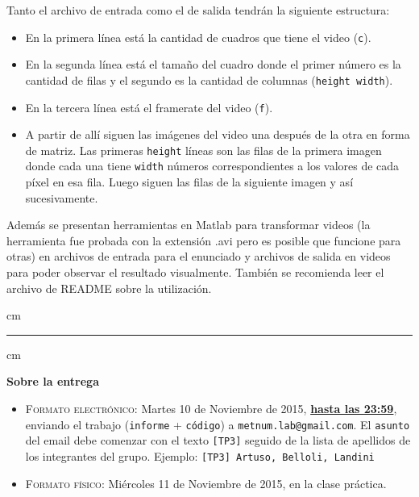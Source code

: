     Tanto el archivo de entrada como el de salida tendrán la siguiente estructura:

    \begin{itemize}
      \item En la primera línea está la cantidad de cuadros que tiene el video (\verb|c|).
      \item En la segunda línea está el tamaño del cuadro donde el primer número es la cantidad de filas y el segundo es la cantidad de columnas (\verb|height width|).
      \item En la tercera línea está el framerate del video (\verb|f|).
      \item A partir de allí siguen las imágenes del video una después de la otra en forma de matriz. Las primeras \verb|height| l\'ineas son las filas de la primera imagen donde cada una tiene \verb|width| n\'umeros correspondientes a los valores de cada píxel en esa fila. Luego siguen las filas de la siguiente imagen y as\'i sucesivamente.
    \end{itemize}

    Además se presentan herramientas en Matlab para transformar videos (la herramienta fue probada con la extensión .avi pero es posible que funcione para otras) en archivos de entrada para el enunciado y archivos de salida en videos para poder observar el resultado visualmente. También se recomienda leer el archivo de README sobre la utilización.


     cm
    \hrule
     cm

    {\bf Sobre la entrega}
    \begin{itemize}
    \item \textsc{Formato electr\'onico:} Martes 10 de Noviembre de 2015, {\bf{\underline{hasta las 23:59}}}, enviando el trabajo
    (\texttt{informe} + \texttt{c\'odigo}) a \texttt{metnum.lab@gmail.com}. El \texttt{asunto} del email debe comenzar con el texto \verb|[TP3]| seguido
    de la lista de apellidos de los integrantes del grupo. Ejemplo: \texttt{[TP3] Artuso, Belloli, Landini}
    \item \textsc{Formato f\'isico:} Mi\'ercoles 11 de Noviembre de 2015, en la clase pr\'actica.
    \end{itemize}
    